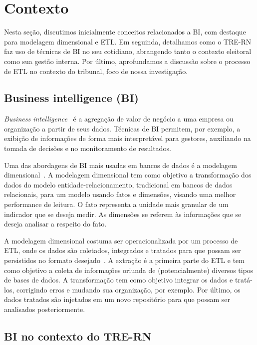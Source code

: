 
\section{Contexto}

Nesta seção, discutimos inicialmente conceitos relacionados a BI, com destaque para modelagem dimensional e ETL. Em seguinda, detalhamos como o TRE-RN faz uso de técnicas de BI no seu cotidiano, abrangendo tanto o contexto eleitoral como sua gestão interna. Por último, aprofundamos a discussão sobre o processo de ETL no contexto do tribunal, foco de nossa investigação.

\subsection{Business intelligence (BI)}

\textit{Business intelligence}~\cite{BI} é a agregação de valor de negócio a uma empresa ou organização a partir de seus dados. Técnicas de BI permitem, por exemplo, a exibição de informações de forma mais interpretável para gestores, auxiliando na tomada de decisões e no monitoramento de resultados. 

Uma das abordagens de BI mais usadas em bancos de dados é a modelagem dimensional~\cite{artmodelagem}. A modelagem dimensional tem como objetivo a transformação dos dados do modelo entidade-relacionamento, tradicional em bancos de dados relacionais, para um modelo usando fatos e dimensões, visando uma melhor performance de leitura. O fato representa a unidade mais granular de um indicador que se deseja medir. As dimensões se referem às informações que se deseja analisar a respeito do fato.

A modelagem dimensional costuma ser operacionalizada por um processo de ETL, onde os dados são coletados, integrados e tratados para que possam ser persistidos no formato desejado~\cite{etl}. A extração é a primeira parte do ETL e tem como objetivo a coleta de informações oriunda de (potencialmente) diversos tipos de bases de dados. A transformação tem como objetivo integrar os dados e tratá-los, corrigindo erros e mudando sua organização, por exemplo. Por último, os dados tratados são injetados em um novo repositório para que possam ser analisados posteriormente.

\subsection{BI no contexto do TRE-RN}

